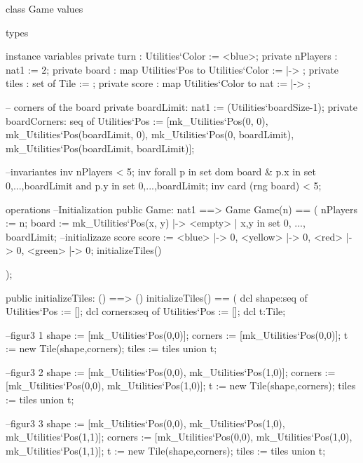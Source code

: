 \begin{vdm_al}
class Game
  values
    
  types
  
  instance variables
    private turn : Utilities`Color := <blue>;
    private nPlayers : nat1 := 2;
    private board : map Utilities`Pos to Utilities`Color := { |-> };
    private tiles : set of Tile := {};
    private score : map Utilities`Color to nat := { |-> };
    
    -- corners of the board
    private boardLimit: nat1 := (Utilities`boardSize-1);
    private boardCorners: seq of Utilities`Pos := [mk_Utilities`Pos(0, 0),
                    mk_Utilities`Pos(boardLimit, 0), mk_Utilities`Pos(0, boardLimit),
                    mk_Utilities`Pos(boardLimit, boardLimit)];
    
    --invariantes
    inv nPlayers < 5;
    inv forall p in set dom board & p.x in set {0,...,boardLimit} and p.y in set {0,...,boardLimit};
    inv card (rng board) < 5;
    
  operations
        --Initialization
        public Game: nat1 ==> Game
          Game(n) == (
            nPlayers := n;
                board := { mk_Utilities`Pos(x, y) |-> <empty> | x,y in set {0, ..., boardLimit}};
                --initializaze score
        score := {<blue> |-> 0, <yellow> |-> 0, <red> |-> 0, <green> |-> 0};
              initializeTiles()
              
          );
        
        public initializeTiles: () ==> ()
          initializeTiles() ==
          (            
            dcl shape:seq of Utilities`Pos := [];
            dcl corners:seq of Utilities`Pos := [];
            dcl t:Tile;
            
            --figur3 1
            shape := [mk_Utilities`Pos(0,0)];
            corners := [mk_Utilities`Pos(0,0)];
            t := new Tile(shape,corners); 
            tiles := tiles union {t};
            
            --figur3 2
            shape := [mk_Utilities`Pos(0,0), mk_Utilities`Pos(1,0)];
            corners := [mk_Utilities`Pos(0,0), mk_Utilities`Pos(1,0)];
            t := new Tile(shape,corners); 
            tiles := tiles union {t};
            
            --figur3 3
            shape := [mk_Utilities`Pos(0,0), mk_Utilities`Pos(1,0), mk_Utilities`Pos(1,1)];
            corners := [mk_Utilities`Pos(0,0), mk_Utilities`Pos(1,0), mk_Utilities`Pos(1,1)];
            t := new Tile(shape,corners); 
            tiles := tiles union {t};
            

\end{vdm_al}
